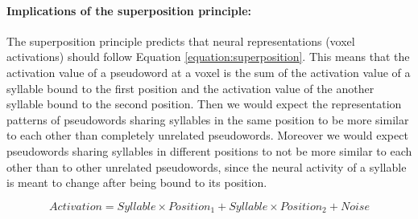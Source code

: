 
\paragraph{Implications of the superposition principle:}
The superposition principle predicts that neural representations (voxel activations) should follow Equation \ref{equation:superposition}.
This means that the activation value of a pseudoword at a voxel is the sum of the activation value of a syllable bound to the first position and the activation value of the another syllable bound to the second position.
Then we would expect the representation patterns of pseudowords sharing syllables in the same position to be more similar to each other than completely unrelated pseudowords.
Moreover we would expect pseudowords sharing syllables in different positions to not be more similar to each other than to other unrelated pseudowords, since the neural activity of a syllable is meant to change after being bound to its position.

\begin{equation}
Activation = Syllable \times Position_1 + Syllable \times Position_2 + Noise
\label{equation:superposition}
\end{equation}


